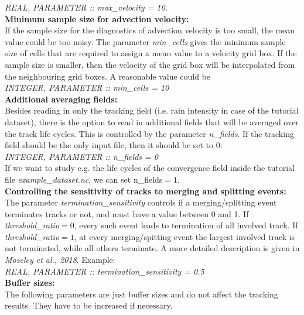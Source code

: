 \documentclass[11pt]{article}
\begin{document}
{\it REAL, PARAMETER       :: max\_velocity = 10.}\vspace{0.5cm} \\
{\bf Minimum sample size for advection velocity:}\\
If the sample size for the diagnostics of advection velocity is too small, the mean value could be too noisy. The parameter {\it min\_cells} gives the minimum sample size of cells that are required to assign a mean value to a velocity grid box. If the sample size is smaller, then the velocity of the grid box will be interpolated from the neighbouring grid boxes. A reasonable value could be\\
{\it INTEGER, PARAMETER    :: min\_cells = 10}\vspace{0.5cm} \\
{\bf Additional averaging fields:}\\
Besides reading in only the tracking field (i.e. rain intensity in case of the tutorial dataset), there is the option to read in additional fields that will be averaged over the track life cycles. This is controlled by the parameter {\it n\_fields}. If the tracking field should be the only input file, then it should be set to 0:\\
{\it INTEGER, PARAMETER    ::  n\_fields = 0} \\
If we want to study e.g. the life cycles of the convergence field inside the  tutorial file {\it example\_dataset.nc}, we can set {n\_fields}$=1$.\vspace{0.5cm} \\
{\bf Controlling the sensitivity of tracks to merging and splitting events:}\\
The parameter {\it termination\_sensitivity} controls if a merging/splitting event terminates tracks or not, and must have a value between 0 and 1. If {\it threshold\_ratio}$=0$, every such event leads to termination of all involved track. If {\it threshold\_ratio}$=1$, at every merging/spitting event the largest involved track is not terminated, while all others terminate. A more detailed description is given in {\it Moseley et al., 2018}. Example:\\
{\it REAL, PARAMETER       :: termination\_sensitivity = 0.5}\vspace{0.5cm} \\
{\bf Buffer sizes:}\\
The following parameters are just buffer sizes and do not affect the tracking results. They have to be increased if necessary.
\end{document}
